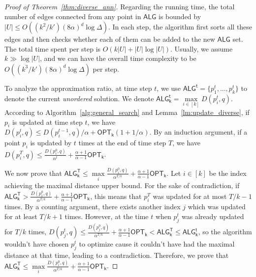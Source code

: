 \begin{proof}[Proof of Theorem~\ref{thm:diverse_ann}]

Regarding the running time, the total number of edges connected from any point in $\mathsf{ALG}$ is bounded by $|U|\le O((k^2/k')(8\alpha)^d\log \Delta)$. In each step, the algorithm first sorts all these edges and then checks whether each of them can be added to the new $\mathsf{ALG}$ set. The total time spent per step is $O(k|U|+|U|\log|U|)$. Usually, we assume $k\gg \log|U|$, and we can have the overall time complexity to be $O\left((k^3/k')(8\alpha)^d\log\Delta\right)$ per step.

To analyze the approximation ratio, at time step $t$, we use $\mathsf{ALG^t}=\{p^t_1,...,p^t_k\}$ to denote the current {\em unordered} solution. We denote $\mathsf{ALG^t_k}=\max\limits_{i\in[k]}D(p^t_i,q)$. According to Algorithm~\ref{alg:general_search} and Lemma~\ref{lm:update_diverse}, if $p_i$ is updated at time step $t$, we have $D(p^t_i,q)\le D(p^{t-1}_i,q)/\alpha+\mathsf{OPT_k}(1+1/\alpha)$. By an induction argument, if a point $p_i$ is updated by $t$ times at the end of time step $T$, we have $D(p^T_i,q)\le \frac{D(p^0_i,q)}{\alpha^t}+\frac{\alpha+1}{\alpha-1}\mathsf{OPT_k}$. 

We now prove that $\mathsf{ALG^T_k}\le \max\limits_{i}\frac{D(p^0_i,q)}{\alpha^{T/k}}+\frac{\alpha+1}{\alpha-1}\mathsf{OPT_k}$. Let $i\in[k]$ be the index achieving the maximal distance upper bound. For the sake of contradiction, if $\mathsf{ALG^T_k}>\frac{D(p^0_i,q)}{\alpha^{T/k}}+\frac{\alpha+1}{\alpha-1}\mathsf{OPT_k}$, this means that $p^T_i$ was updated for at most $T/k-1$ times. By a counting argument, there exists another index $j$ which was updated for at least $T/k+1$ times. However, at the time $t$ when $p^t_j$ was already updated for $T/k$ times, $D(p^t_j,q)\le \frac{D(p^0_j,q)}{\alpha^{T/k}}+\frac{\alpha+1}{\alpha-1}\mathsf{OPT_k} < \mathsf{ALG^T_k}\le \mathsf{ALG^t_k}$, so the algorithm wouldn't have chosen $p^t_j$ to optimize cause it couldn't have had the maximal distance at that time, leading to a contradiction. Therefore, we prove that $\mathsf{ALG^T_k}\le \max\limits_{i}\frac{D(p^0_i,q)}{\alpha^{T/k}}+\frac{\alpha+1}{\alpha-1}\mathsf{OPT_k}$.


\end{proof}
